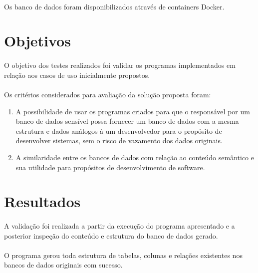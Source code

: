 \paragraph{} Os banco de dados foram disponibilizados através de containers Docker.

\section{Objetivos}

\paragraph{} O objetivo dos testes realizados foi validar os programas implementados em relação aos casos de uso inicialmente propostos.

\paragraph{} Os critérios considerados para avaliação da solução proposta foram:

\begin{enumerate}
    \item A possibilidade de usar os programas criados para que o responsável por um banco de dados sensível possa fornecer um banco de dados com a mesma estrutura e dados análogos à um desenvolvedor para o propósito de desenvolver sistemas, sem o risco de vazamento dos dados originais.
    \item A similaridade entre os bancos de dados com relação ao conteúdo semântico e sua utilidade para propósitos de desenvolvimento de software.
\end{enumerate}

\section{Resultados}

\paragraph{} A validação foi realizada a partir da execução do programa apresentado e a posterior inspeção do conteúdo e estrutura do banco de dados gerado.

\paragraph{} O programa gerou toda estrutura de tabelas, colunas e relações existentes nos bancos de dados originais com sucesso.

